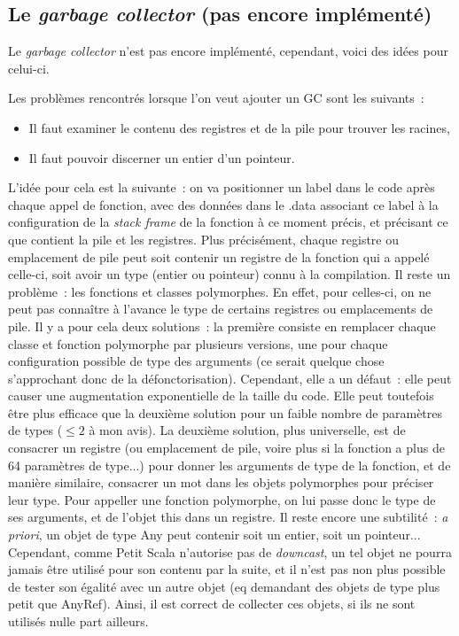 \documentclass[a4paper,10pt]{article}
\newcommand{\code}[1]{{\fontfamily{pcr}\selectfont #1}}
\begin{document}
\subsection{Le \textit{garbage collector} (pas encore implémenté)}
Le \textit{garbage collector} n'est pas encore implémenté, cependant,
voici des idées pour celui-ci.\\ \par
Les problèmes rencontrés lorsque l'on veut ajouter un GC sont les
suivants~:
\begin{itemize}
\item{Il faut examiner le contenu des registres et de la pile pour
    trouver les racines,}
\item{Il faut pouvoir discerner un entier d'un pointeur.}
\end{itemize} \par
L'idée pour cela est la suivante~: on va positionner un label dans le
code après chaque appel de fonction, avec des données dans le
\code{.data} associant ce label à la configuration de la \textit{stack
  frame} de la fonction à ce moment précis, et précisant ce que
contient la pile et les registres. Plus précisément, chaque registre
ou emplacement de pile peut soit contenir un registre de la fonction
qui a appelé celle-ci, soit avoir un type (entier ou pointeur) connu à
la compilation. Il reste un problème~: les fonctions et classes
polymorphes. En effet, pour celles-ci, on ne peut pas connaître à
l'avance le type de certains registres ou emplacements de pile. Il y a
pour cela deux solutions~: la première consiste en remplacer chaque
classe et fonction polymorphe par plusieurs versions, une pour chaque
configuration possible de type des arguments (ce serait quelque chose
s'approchant donc de la défonctorisation). Cependant, elle a un
défaut~: elle peut causer une augmentation exponentielle de la taille
du code. Elle peut toutefois être plus efficace que la deuxième
solution pour un faible nombre de paramètres de types ($\leqslant 2$ à
mon avis). La deuxième solution, plus universelle, est de consacrer un
registre (ou emplacement de pile, voire plus si la fonction a plus de
64 paramètres de type...) pour donner les arguments de type de la
fonction, et de manière similaire, consacrer un mot dans les objets
polymorphes pour préciser leur type. Pour appeller une fonction
polymorphe, on lui passe donc le type de ses arguments, et de l'objet
\code{this} dans un registre. Il reste encore une subtilité~:
\textit{a priori}, un objet de type \code{Any} peut contenir soit un
entier, soit un pointeur... Cependant, comme Petit Scala n'autorise
pas de \textit{downcast}, un tel objet ne pourra jamais être utilisé
pour son contenu par la suite, et il n'est pas non plus possible de
tester son égalité avec un autre objet (\code{eq} demandant des objets
de type plus petit que \code{AnyRef}). Ainsi, il est correct de
collecter ces objets, si ils ne sont utilisés nulle part ailleurs.
\end{document}
